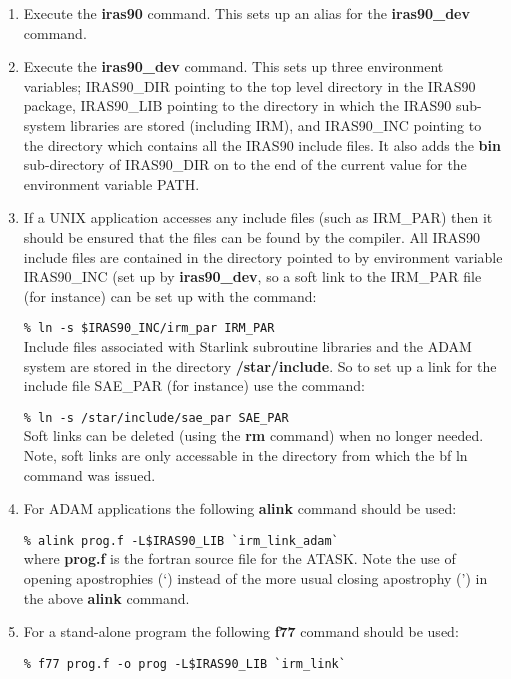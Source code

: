 \begin{enumerate}
\item Execute the {\bf iras90} command. This sets up an alias for the
{\bf iras90\_dev} command.

\item Execute the {\bf iras90\_dev} command.  This sets up three
environment variables; IRAS90\_DIR pointing to the top level directory
in the IRAS90 package, IRAS90\_LIB pointing to the directory in which
the IRAS90 sub-system libraries are stored (including IRM), and
IRAS90\_INC pointing to the directory which contains all the IRAS90
include files. It also adds the {\bf bin} sub-directory of IRAS90\_DIR
on to the end of the current value for the environment variable PATH.

\item If a UNIX application accesses any include files (such as
IRM\_PAR) then it should be ensured that the files can be found by the
compiler. All IRAS90 include files are contained in the directory
pointed to by environment variable IRAS90\_INC (set up by {\bf
iras90\_dev}, so a soft link to the IRM\_PAR file (for instance) can be
set up with the command:

\verb+% ln -s $IRAS90_INC/irm_par IRM_PAR+\\

Include files associated with Starlink subroutine libraries and the
ADAM system are stored in the directory {\bf /star/include}. So to set
up a link for the include file SAE\_PAR (for instance) use the command:

\verb+% ln -s /star/include/sae_par SAE_PAR+\\

Soft links can be deleted (using the {\bf rm} command) when no longer needed.
Note, soft links are only accessable in the directory from which the {bf ln}
command was issued.

\item For ADAM applications the following {\bf alink} command should be used:

\verb+% alink prog.f -L$IRAS90_LIB `irm_link_adam`+\\

where {\bf prog.f} is the fortran source file for the ATASK.
Note the use of opening apostrophies (`) instead of the more usual closing
apostrophy (') in the above {\bf alink} command.

\item For a stand-alone program the following {\bf f77} command should be used:

\verb+% f77 prog.f -o prog -L$IRAS90_LIB `irm_link`+\\
\end{enumerate}


